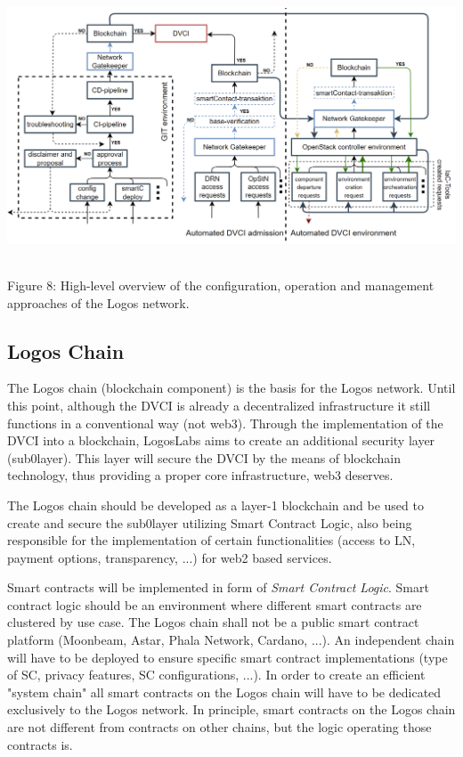 \documentclass[]{article}
\begin{document}
\begin{center}
	\includegraphics[height=8cm]{configuration-operation-management-approach}
\end{center}
\begin{center}
	Figure 8: High-level overview of the configuration, operation and management approaches of the Logos network.
\end{center}

\subsection{Logos Chain}
The Logos chain (blockchain component) is the basis for the Logos network. 
Until this point, although the DVCI is already a decentralized infrastructure it still functions in a conventional way (not web3).
Through the implementation of the DVCI into a blockchain, LogosLabs aims to create an additional security layer (sub0layer). 
This layer will secure the DVCI by the means of blockchain technology, thus providing a proper core infrastructure, web3 deserves.

The Logos chain should be developed as a layer-1 blockchain and be used to create and secure the sub0layer utilizing Smart Contract Logic, also being responsible for the implementation of certain functionalities (access to LN, payment options, transparency, ...) for web2 based services.

Smart contracts will be implemented in form of \textit{Smart Contract Logic}.
Smart contract logic should be an environment where different smart contracts are clustered by use case.
The Logos chain shall not be a public smart contract platform (Moonbeam, Astar, Phala Network, Cardano, ...).
An independent chain will have to be deployed to ensure specific smart contract implementations (type of SC, privacy features, SC configurations, ...). 
In order to create an efficient "system chain" all smart contracts on the Logos chain will have to be dedicated exclusively to the Logos network.
In principle, smart contracts on the Logos chain are not different from contracts on other chains, but the logic operating those contracts is.
\end{document}

